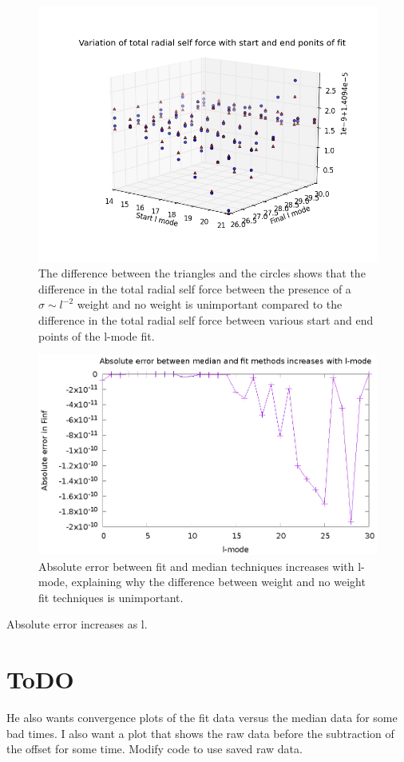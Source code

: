 \begin{figure}
  \includegraphics{3Dscatterwithwithoutsigmalminlmax}
  \caption{The difference between the triangles and the circles shows that the difference in the total radial self force between the presence of a $\sigma\sim l^{-2}$ weight and no weight is unimportant compared to the difference in the total radial self force between various start and end points of the l-mode fit.}
\end{figure}

\begin{figure}
  \includegraphics{absErrorIncreaseslmode}
  \caption{Absolute error between fit and median techniques increases with l-mode, explaining why the difference between weight and no weight fit techniques is unimportant.}
\end{figure}

Absolute error increases as l. 


\section{ToDO}
He also wants convergence plots of the fit data versus the median data for some bad times. I also want a plot that shows the raw data before the subtraction of the offset for some time. Modify code to use saved raw data.
